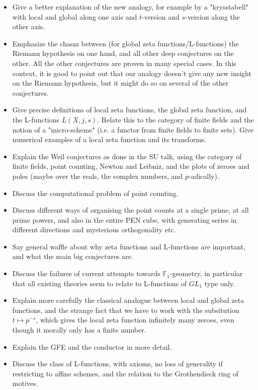 \documentclass[paper=a4, fontsize=11pt]{scrartcl} %
\numberwithin{equation}{section} %
\numberwithin{figure}{section} %
\numberwithin{table}{section} %
\begin{document}
\begin{itemize}
\item Give a better explanation of the new analogy, for example by a "krysstabell" with local and global along one axis and $t$-version and $s$-version along the other axis.
\item Emphasize the chasm between (for global zeta functions/L-functions) the Riemann hypothesis on one hand, and all other deep conjectures on the other. All the other conjectures are proven in many special cases. In this context, it is good to point out that our analogy doesn't give any new insight on the Riemann hypothesis, but it might do so on several of the other conjectures.
\item Give precise definitions of local zeta functions, the global zeta function, and the L-functions $L(X, j, s)$. Relate this to the category of finite fields and the notion of a "micro-scheme" (i.e. a functor from finite fields to finite sets). Give numerical examples of a local zeta function and its transforms.
\item Explain the Weil conjectures as done in the SU talk, using the category of finite fields, point counting, Newton and Leibniz, and the plots of zeroes and poles (maybe over the reals, the complex numbers, and $p$-adically).
\item Discuss the computational problem of point counting.
\item Discuss different ways of organising the point counts at a single prime, at all prime powers, and also in the entire PEN cube, with generating series in different directions and mysterious orthogonality etc.
\item Say general waffle about why zeta functions and L-functions are important, and what the main big conjectures are.
\item Discuss the failures of current attempts towards $\mathbb{F}_1$-geometry, in particular that all existing theories seem to relate to L-functions of $GL_1$ type only.
\item Explain more carefully the classical analogue between local and global zeta functions, and the strange fact that we have to work with the subsitution $t \mapsto p^{-s}$, which gives the local zeta function infinitely many zeroes, even though it morally only has a finite number.
\item Explain the GFE and the conductor in more detail.
\item Discuss the class of L-functions, with axioms, no loss of generality if restricting to affine schemes, and the relation to the Grothendieck ring of motives.
\end{itemize}
\end{document}
